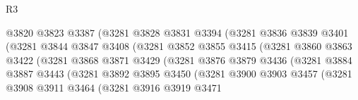\begin{lexlean}{R3}
\begin{coremodule}
                                  @3820
                                  @3823
                                  @3387
                                  (@3281
                                    @3828
                                    @3831
                                    @3394
                                    (@3281
                                      @3836
                                      @3839
                                      @3401
                                      (@3281
                                        @3844
                                        @3847
                                        @3408
                                        (@3281
                                          @3852
                                          @3855
                                          @3415
                                          (@3281
                                            @3860
                                            @3863
                                            @3422
                                            (@3281
                                              @3868
                                              @3871
                                              @3429
                                              (@3281
                                                @3876
                                                @3879
                                                @3436
                                                (@3281
                                                  @3884
                                                  @3887
                                                  @3443
                                                  (@3281
                                                    @3892
                                                    @3895
                                                    @3450
                                                    (@3281
                                                      @3900
                                                      @3903
                                                      @3457
                                                      (@3281
                                                        @3908
                                                        @3911
                                                        @3464
                                                        (@3281
                                                          @3916
                                                          @3919
                                                          @3471

\end{coremodule}
\end{lexlean}

